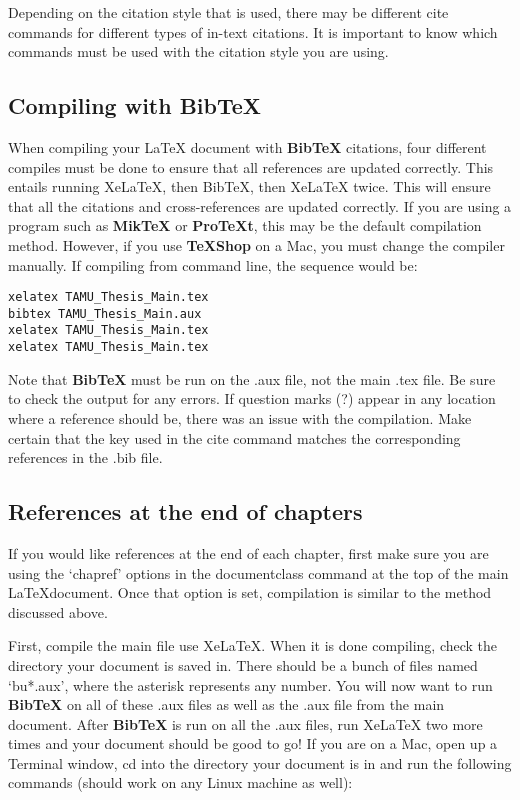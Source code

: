 Depending on the citation style that is used, there may be different cite commands for different types of in-text citations. It is important to know which commands must be used with the citation style you are using.

\subsection{Compiling with BibTeX}
When compiling your \LaTeX{} document with {\bf BibTeX} citations, four different compiles must be done to ensure that all references are updated correctly. This entails running XeLaTeX, then BibTeX, then XeLaTeX twice. This will ensure that all the citations and cross-references are updated correctly. If you are using a program such as \textbf{MikTeX} or \textbf{ProTeXt}, this may be the default compilation method. However, if you use \textbf{TeXShop} on a Mac, you must change the compiler manually. If compiling from command line, the sequence would be:

\begin{verbatim}
xelatex TAMU_Thesis_Main.tex
bibtex TAMU_Thesis_Main.aux
xelatex TAMU_Thesis_Main.tex
xelatex TAMU_Thesis_Main.tex
\end{verbatim}

Note that {\bf BibTeX} must be run on the .aux file, not the main .tex file. Be sure to check the output for any errors. If question marks (?) appear in any location where a reference should be, there was an issue with the compilation. Make certain that the key used in the cite command matches the corresponding references in the .bib file.

\subsection{References at the end of chapters}
If you would like references at the end of each chapter, first make sure you are using the `chapref' options in the documentclass command at the top of the main \LaTeX document. Once that option is set, compilation is similar to the method discussed above.

First, compile the main file use XeLaTeX. When it is done compiling, check the directory your document is saved in. There should be a bunch of files named `bu*.aux', where the asterisk represents any number. You will now want to run {\bf BibTeX} on all of these .aux files as well as the .aux file from the main document. After {\bf BibTeX} is run on all the .aux files, run XeLaTeX two more times and your document should be good to go! If you are on a Mac, open up a Terminal window, cd into the directory your document is in and run the following commands (should work on any Linux machine as well):

